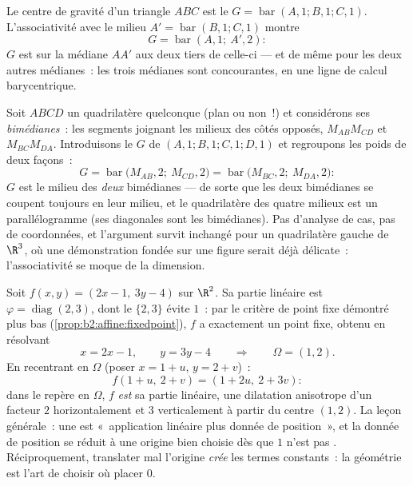 \begin{example}\label{ex:b2:affine:median}
Le centre de gravité d'un triangle $ABC$ est le  $G =
\operatorname{bar}(A,1; B,1; C,1)$. L'associativité avec le
milieu $A' = \operatorname{bar}(B, 1; C, 1)$ montre
\[
G = \operatorname{bar}(A, 1;\ A', 2) :
\]
$G$ est sur la médiane $AA'$ aux deux tiers de celle-ci --- et de même
pour les deux autres médianes~: les trois médianes sont concourantes, en
une ligne de calcul barycentrique.
\end{example}

\begin{example}\label{ex:b2:affine:bimedians}
Soit $ABCD$ un quadrilatère quelconque (plan ou non~!) et considérons
ses \emph{bimédianes}~: les segments joignant les milieux des
côtés opposés, $M_{AB}M_{CD}$ et $M_{BC}M_{DA}$. Introduisons
le  $G$ de $(A,1; B,1; C,1; D,1)$ et regroupons les
poids de deux façons~:
\[
G = \operatorname{bar}\bigl(M_{AB}, 2;\ M_{CD}, 2\bigr)
= \operatorname{bar}\bigl(M_{BC}, 2;\ M_{DA}, 2\bigr) :
\]
$G$ est le milieu des \emph{deux} bimédianes --- de sorte que les deux
bimédianes se coupent toujours en leur milieu, et le quadrilatère des
quatre milieux est un parallélogramme (ses diagonales sont les
bimédianes). Pas d'analyse de cas, pas de coordonnées, et
l'argument survit inchangé pour un quadrilatère gauche de
$\R^3$, où une démonstration fondée sur une figure serait déjà
délicate~: l'associativité se moque de la dimension.
\end{example}

\begin{example}\label{ex:b2:affine:dilation}
Soit $f(x, y) = (2x - 1,\ 3y - 4)$ sur $\R^2$. Sa partie linéaire
est $\varphi = \operatorname{diag}(2, 3)$, dont le 
$\{2, 3\}$ évite $1$~: par le critère de point fixe démontré
plus bas (\cref{prop:b2:affine:fixedpoint}), $f$ a exactement un
point fixe, obtenu en résolvant
\[
x = 2x - 1, \qquad y = 3y - 4
\qquad\Longrightarrow\qquad \Omega = (1, 2).
\]
En recentrant en $\Omega$ (poser $x = 1 + u$, $y = 2 + v$)~:
\[
f(1 + u,\ 2 + v) = (1 + 2u,\ 2 + 3v) :
\]
dans le repère en $\Omega$, $f$ \emph{est} sa partie linéaire, une
dilatation anisotrope d'un facteur $2$ horizontalement et $3$
verticalement à partir du centre $(1, 2)$. La leçon générale~: une
 est «~application linéaire plus donnée de
position~», et la donnée de position se réduit à une origine bien
choisie dès que $1$ n'est pas . Réciproquement,
translater mal l'origine \emph{crée} les termes constants~: la
géométrie  est l'art de choisir où placer $0$.
\end{example}


